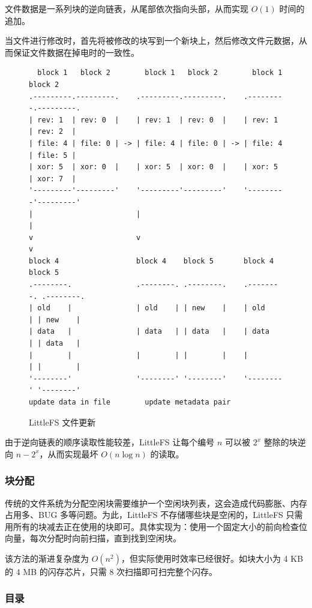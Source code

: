 \documentclass{ctexart}
\begin{document}
文件数据是一系列块的逆向链表，从尾部依次指向头部，从而实现 $O(1)$ 时间的追加。

当文件进行修改时，首先将被修改的块写到一个新块上，然后修改文件元数据，从而保证文件数据在掉电时的一致性。

\begin{figure}
\begin{verbatim}
  block 1   block 2        block 1   block 2        block 1   block 2
.---------.---------.    .---------.---------.    .---------.---------.
| rev: 1  | rev: 0  |    | rev: 1  | rev: 0  |    | rev: 1  | rev: 2  |
| file: 4 | file: 0 | -> | file: 4 | file: 0 | -> | file: 4 | file: 5 |
| xor: 5  | xor: 0  |    | xor: 5  | xor: 0  |    | xor: 5  | xor: 7  |
'---------'---------'    '---------'---------'    '---------'---------'
|                        |                                  |
v                        v                                  v
block 4                  block 4    block 5       block 4    block 5
.--------.               .--------. .--------.    .--------. .--------.
| old    |               | old    | | new    |    | old    | | new    |
| data   |               | data   | | data   |    | data   | | data   |
|        |               |        | |        |    |        | |        |
'--------'               '--------' '--------'    '--------' '--------'
update data in file        update metadata pair
\end{verbatim}
\caption{LittleFS 文件更新}
\end{figure}

由于逆向链表的顺序读取性能较差，LittleFS 让每个编号 $n$ 可以被 $2^x$ 整除的块逆向 $n-2^x$，从而实现最坏 $O(n \log n)$ 的读取。

\subsubsection{块分配}

传统的文件系统为分配空闲块需要维护一个空闲块列表，这会造成代码膨胀、内存占用多、BUG 多等问题。为此，LittleFS 不存储哪些块是空闲的，LittleFS 只需用所有的块减去正在使用的块即可。具体实现为：使用一个固定大小的前向检查位向量，每次分配时向前扫描，直到找到空闲块。

该方法的渐进复杂度为 $O(n^2)$，但实际使用时效率已经很好。如块大小为 4 KB 的 4 MB 的闪存芯片，只需 8 次扫描即可扫完整个闪存。

\subsubsection{目录}
\end{document}
